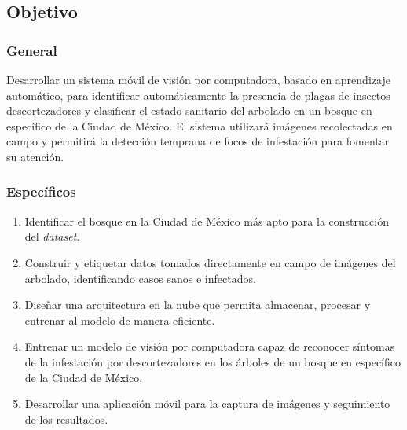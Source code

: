 
\subsection{Objetivo}

\subsubsection{General}
Desarrollar un sistema móvil de visión por computadora, basado en aprendizaje automático, para identificar automáticamente la presencia de plagas de insectos descortezadores y clasificar el estado sanitario del arbolado en un bosque en específico de la Ciudad de México. El sistema utilizará imágenes recolectadas en campo y permitirá la detección temprana de focos de infestación para fomentar su atención.

\subsubsection{Específicos}

\begin{enumerate}
    \item Identificar el bosque en la Ciudad de México más apto para la construcción del \textit{dataset}.
    \item Construir y etiquetar datos tomados directamente en campo de imágenes del arbolado, identificando casos sanos e infectados.
    \item Diseñar una arquitectura en la nube que permita almacenar, procesar y entrenar al modelo de manera eficiente.
    \item Entrenar un modelo de visión por computadora capaz de reconocer síntomas de la infestación por descortezadores en los árboles de un bosque en específico de la Ciudad de México.
    \item Desarrollar una aplicación móvil para la captura de imágenes y seguimiento de los resultados.
\end{enumerate}